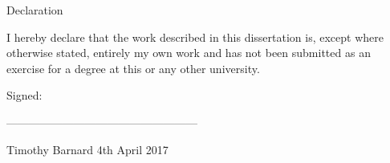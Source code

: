 \begin{Declaration}
Declaration


I hereby declare that the work described in this dissertation is, except where otherwise stated, entirely my own work and has not been submitted as an exercise for a degree at this or any other university.


Signed:

---------------------------------------------------

Timothy Barnard
4th April 2017

\end{Declaration}
